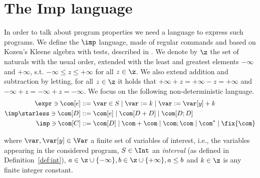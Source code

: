 \section{The Imp language}

In order to talk about program properties we need a language to
express such programs. We define the \(\imp\) language, made of
regular commands and based on Kozen’s Kleene algebra with tests,
described in \cite{kozen1997kleene}.  We denote by \(\z\) the set of
naturals with the usual order, extended with the least and greatest
elements \(-\infty\) and \(+\infty\), s.t.
\(-\infty \leq z \leq +\infty\) for all \(z \in \z\). We also extend
addition and subtraction by letting, for all \(z \in \z\) it holds
that \(+\infty + z = + \infty - z = + \infty\) and
\(-\infty + z = -\infty + z = -\infty\).  We focus on the following
non-deterministic language.
\begin{align*}
  \expr \ni \com[e] ::= & \; \var \in S %
                          \mid \var := k \mid \var := \var[y] + k %
  \\
  \imp\starless \ni \com[D] ::= & \; \com[e] \mid \com[D + D] \mid \com[D ; D] \\
  \imp \ni \com[C] ::= & \; \com[D] \mid \com + \com \mid \com ; \com \mid \com^* \mid \fix{\com}
\end{align*}

where \(\var, \var[y] \in \Var\) a finite set of variables of
interest, i.e., the variables appearing in the considered program,
\(S\in\Int\) an \emph{interval} (as defined in
Definition~\ref{def:int}),
\({a \in \z \cup \{-\infty\}}, {b \in \z \cup\{+\infty\}}, {a\leq b}\)
and \({k \in \z}\) is any finite integer constant.
